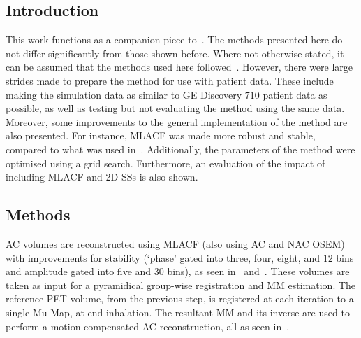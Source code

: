         \subsection{Introduction} \label{sec:evaluation_of_pet_ct_motion_correction_incorporating_motion_models_using_mlacf_and_complex_gating_schemes_introduction}
            This work functions as a companion piece to~. The methods presented here do not differ significantly from those shown before. Where not otherwise stated, it can be assumed that the methods used here followed~. However, there were large strides made to prepare the method for use with patient data. These include making the simulation data as similar to \gls{GE} Discovery $710$ patient data as possible, as well as testing but not evaluating the method using the same data. Moreover, some improvements to the general implementation of the method are also presented. For instance, \gls{MLACF} was made more robust and stable, compared to what was used in~. Additionally, the parameters of the method were optimised using a grid search. Furthermore, an evaluation of the impact of including \gls{MLACF} and \gls{2D} \glspl{SS} is also shown.
        
        \subsection{Methods} \label{sec:evaluation_of_pet_ct_motion_correction_incorporating_motion_models_using_mlacf_and_complex_gating_schemes_methods}
            \gls{AC} volumes are reconstructed using \gls{MLACF} (also using \gls{AC} and \gls{NAC} \gls{OSEM}) with improvements for stability (`phase' gated into three, four, eight, and $12$ bins and amplitude gated into five and $30$ bins), as seen in~ and~. These volumes are taken as input for a pyramidical group-wise registration and \gls{MM} estimation. The reference \gls{PET} volume, from the previous step, is registered at each iteration to a single \gls{Mu-Map}, at end inhalation. The resultant \gls{MM} and its inverse are used to perform a motion compensated \gls{AC} reconstruction, all as seen in~.
            
